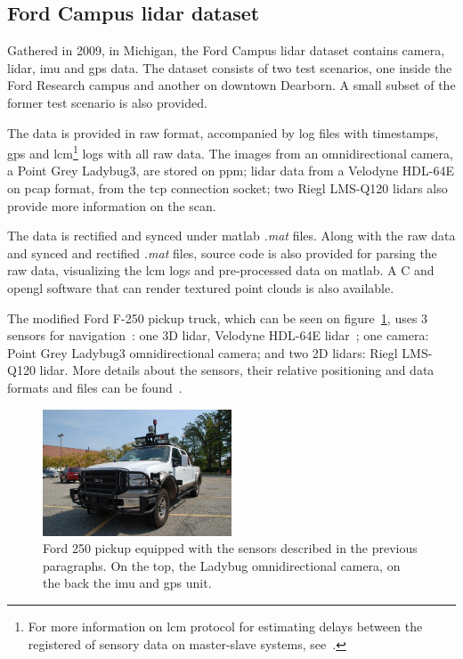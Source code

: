 \subsection{Ford Campus \acl{lidar} dataset}
Gathered in 2009, in Michigan, the Ford Campus \ac{lidar} dataset contains camera, \ac{lidar}, \ac{imu} and \ac{gps} data. The dataset consists of two test scenarios, one inside the Ford Research campus and another on downtown Dearborn. A small subset of the former test scenario is also provided.

The data is provided in raw format, accompanied by log files with timestamps, \ac{gps} and \ac{lcm}\footnote{For more information on \acf{lcm} protocol for estimating delays between the registered of sensory data on master-slave systems, see~\cite{VelodyneHDL64}.} logs with all raw data. The images from an omnidirectional camera, a Point Grey Ladybug3, are stored on \ac{ppm}; \ac{lidar} data from a Velodyne HDL-64E on \ac{pcap} format, from the \ac{tcp} connection socket; two Riegl LMS-Q120 \acp{lidar} also provide more information on the scan.

The data is rectified and synced under \ac{matlab} \textit{.mat} files. Along with the raw data and synced and rectified \textit{.mat} files, source code is also provided for parsing the raw data, visualizing the \ac{lcm} logs and pre-processed data on \ac{matlab}. A C and \ac{opengl} software that can render textured point clouds is also available.

The modified Ford F-250 pickup truck, which can be seen on figure~\ref{fig:sota:ford_sensors}, uses 3 sensors for navigation~\cite{Pandey2011}: one 3D \ac{lidar}, Velodyne HDL-64E \ac{lidar}~\cite{VelodyneHDL64}; one camera: Point Grey Ladybug3 omnidirectional camera; and two 2D \acp{lidar}: Riegl LMS-Q120 lidar. More details about the sensors, their relative positioning and data formats and files can be found~\cite{Pandey2011}.

\begin{figure}
	\centering
	\includegraphics[width=0.5\textwidth]{img/sensor_fusion/ford_sensors.jpg}
	\caption{Ford 250 pickup equipped with the sensors described in the previous paragraphs. On the top, the Ladybug omnidirectional camera, on the back the \ac{imu} and \ac{gps} unit. }
	\label{fig:sota:ford_sensors}
\end{figure}



